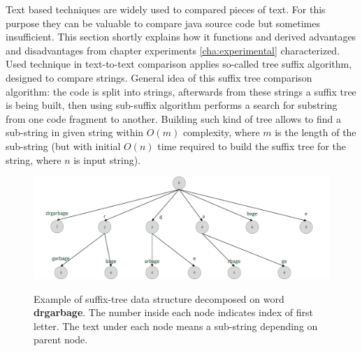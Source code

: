 \documentclass{report}
\begin{document}
Text based techniques are widely used to compared pieces of text. For this purpose they can be valuable to compare java source code but sometimes insufficient. This section shortly explains how it functions and derived advantages and disadvantages from chapter experiments \ref{cha:experimental} characterized. Used technique in text-to-text comparison applies so-called tree suffix algorithm, designed to compare strings. General idea of this suffix tree comparison algorithm: the code is split into strings, afterwards from these strings a suffix tree is being built, then using sub-suffix algorithm performs a search for substring from one code fragment to another. Building such kind of tree allows to find a sub-string in given string within $O(m)$ complexity, where $m$ is the length of the sub-string (but with initial $O(n)$ time required to build the suffix tree for the string, where $n$ is input string). 
\vspace{5mm}
\begin{figure}[h]
  \centering
  \includegraphics[scale=0.65]{Figures/exist-alg/suffix-tree.pdf}\\[0.1cm]
  \caption[Example of suffix-tree]{Example of suffix-tree data structure decomposed on word \textbf{drgarbage}. The number inside each node indicates index of first letter. The text under each node means a sub-string depending on parent node.}
  \label{fig:suffixtreeexample}
\end{figure}
\end{document}
